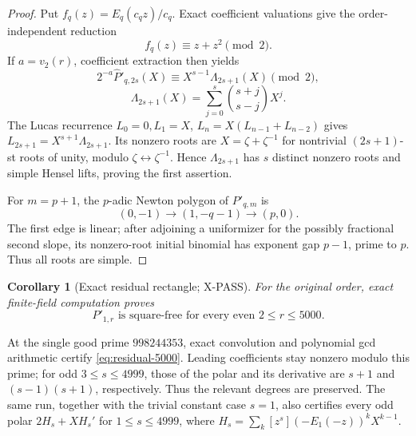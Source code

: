 \documentclass[11pt]{article}
\theoremstyle{keio}
\newtheorem{corollary}[theorem]{Corollary}
\theoremstyle{keioinput}
\newcommand{\XPASS}{\textcolor{xpassblue}{\textsf{X-PASS}}}
\begin{document}
\begin{proof}
Put $f_q(z)=E_q(c_qz)/c_q$. Exact coefficient valuations give the
order-independent reduction
\[
f_q(z)\equiv z+z^2\pmod2.
\]
If $a=v_2(r)$, coefficient extraction then yields
\begin{equation}
2^{-a}\widehat P'_{q,2s}(X)\equiv
X^{s-1}\Lambda_{2s+1}(X)\pmod2,
\label{eq:lambda-reduction}
\end{equation}
\begin{equation}
\Lambda_{2s+1}(X)=
\sum_{j=0}^s\binom{s+j}{s-j}X^j.
\label{eq:lambda}
\end{equation}
The Lucas recurrence $L_0=0,L_1=X$,
$L_n=X(L_{n-1}+L_{n-2})$ gives
$L_{2s+1}=X^{s+1}\Lambda_{2s+1}$. Its nonzero roots are
$X=\zeta+\zeta^{-1}$ for nontrivial $(2s+1)$-st roots of unity, modulo
$\zeta\leftrightarrow\zeta^{-1}$. Hence $\Lambda_{2s+1}$ has $s$
distinct nonzero roots and simple Hensel lifts, proving the first assertion.

For $m=p+1$, the $p$-adic Newton polygon of $P'_{q,m}$ is
\begin{equation}
(0,-1)\longrightarrow(1,-q-1)\longrightarrow(p,0).
\label{eq:prime-successor-NP}
\end{equation}
The first edge is linear; after adjoining a uniformizer for the possibly
fractional second slope, its nonzero-root initial binomial has exponent gap
$p-1$, prime to $p$. Thus all roots are simple.
\end{proof}

\begin{corollary}[Exact residual rectangle; \XPASS]\label{cor:residual-5000}
For the original order, exact finite-field computation proves
\begin{equation}
\boxed{P'_{1,r}\text{ is square-free for every even }2\le r\le5000.}
\label{eq:residual-5000}
\end{equation}
\end{corollary}

At the single good prime $998244353$, exact convolution and polynomial gcd
arithmetic certify \eqref{eq:residual-5000}. Leading coefficients stay
nonzero modulo this prime; for odd $3\le s\le4999$, those of the polar and
its derivative are $s+1$ and $(s-1)(s+1)$, respectively. Thus the relevant
degrees are preserved. The same run, together with the trivial constant
case $s=1$, also certifies every odd polar $2H_s+XH_s'$ for
$1\le s\le4999$, where
$H_s=\sum_k[z^s](-E_1(-z))^kX^{k-1}$.
\end{document}
